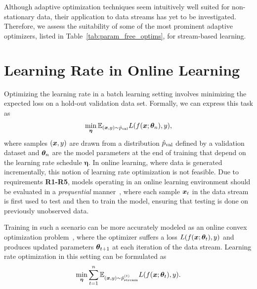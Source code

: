 \documentclass{article} %
\begin{document}
Although adaptive optimization techniques seem intuitively well suited for non-stationary data, their application to data streams has yet to be investigated.
Therefore, we assess the suitability of some of the most prominent adaptive optimizers, listed in Table~\ref{tab:param_free_optims}, for stream-based learning.

\section{Learning Rate in Online Learning}

Optimizing the learning rate in a batch learning setting involves minimizing the expected loss on a hold-out validation data set.
Formally, we can express this task as
\begin{equation}
   \label{eq:batch_lr_optim}
   \min_{\bm{\eta}} \mathbb{E}_{({\bm{x}}, y) \sim \hat{p}_{\rm{val}}} L(f({\bm{x}}; {\bm{\theta}}_n), y),
\end{equation}
where samples $({\bm{x}}, y)$ are drawn from a distribution $\hat{p}_{\rm{val}}$ defined by a validation dataset and ${\bm{\theta}}_n$ are the model parameters at the end of training that depend on the learning rate schedule $\bm{\eta}$.
In online learning, where data is generated incrementally, this notion of learning rate optimization is not feasible.
Due to requirements \textbf{R1-R5}, models operating in an online learning environment should be evaluated in a \textit{prequential} manner~\citep{bifetMOAMassiveOnline2010}, where each sample ${\bm{x}}_t$ in the data stream is first used to test and then to train the model, ensuring that testing is done on previously unobserved data.

Training in such a scenario can be more accurately modeled as an online convex optimization problem~\citep{shalev-shwartzOnlineLearningOnline2011,hazanIntroductionOnlineConvex2016}, where the optimizer suffers a loss $L(f({\bm{x}}; {\bm{\theta}}_t), y)$ and produces updated parameters ${\bm{\theta}}_{t+1}$ at each iteration of the data stream.
Learning rate optimization in this setting can be formulated as
\begin{equation}
   \label{eq:stream_lr_optim}
   \min_{\bm{\eta}} \sum_{t=1}^{n} \mathbb{E}_{({\bm{x}}, y) \sim \hat{p}_{\rm{stream}}^{(t)}} L(f({\bm{x}}; {\bm{\theta}}_t), y).
\end{equation}
\end{document}

